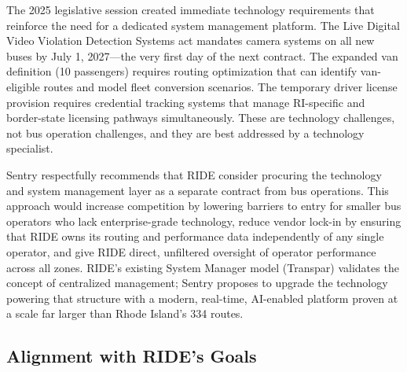 The 2025 legislative session created immediate technology requirements that reinforce the need for a dedicated system management platform. The Live Digital Video Violation Detection Systems act mandates camera systems on all new buses by July 1, 2027---the very first day of the next contract. The expanded van definition (10 passengers) requires routing optimization that can identify van-eligible routes and model fleet conversion scenarios. The temporary driver license provision requires credential tracking systems that manage RI-specific and border-state licensing pathways simultaneously. These are technology challenges, not bus operation challenges, and they are best addressed by a technology specialist.

Sentry respectfully recommends that RIDE consider procuring the technology and system management layer as a separate contract from bus operations. This approach would increase competition by lowering barriers to entry for smaller bus operators who lack enterprise-grade technology, reduce vendor lock-in by ensuring that RIDE owns its routing and performance data independently of any single operator, and give RIDE direct, unfiltered oversight of operator performance across all zones. RIDE's existing System Manager model (Transpar) validates the concept of centralized management; Sentry proposes to upgrade the technology powering that structure with a modern, real-time, AI-enabled platform proven at a scale far larger than Rhode Island's 334 routes.

\subsection{Alignment with RIDE's Goals}

